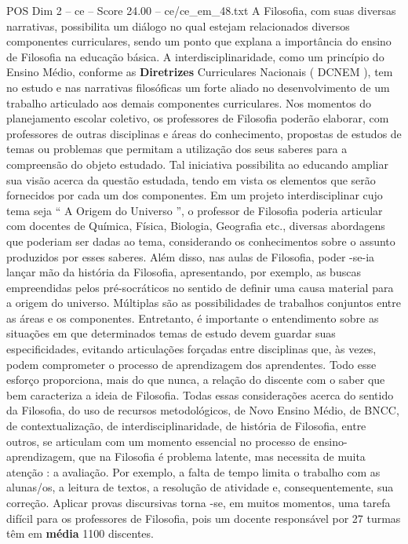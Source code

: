 \begin{textsample}{POS Dim 2 – ce – Score 24.00 – ce/ce\_em\_48.txt}
A Filosofia, com suas diversas narrativas, possibilita um diálogo no qual estejam relacionados diversos componentes curriculares, sendo um ponto que explana a importância do ensino de Filosofia na educação básica.
A interdisciplinaridade, como um princípio do Ensino Médio, conforme as \textbf{Diretrizes} Curriculares Nacionais ( DCNEM ), tem no estudo e nas narrativas filosóficas um forte aliado no desenvolvimento de um trabalho articulado aos demais componentes curriculares.
Nos momentos do planejamento escolar coletivo, os professores de Filosofia poderão elaborar, com professores de outras disciplinas e áreas do conhecimento, propostas de estudos de temas ou problemas que permitam a utilização dos seus saberes para a compreensão do objeto estudado.
Tal iniciativa possibilita ao educando ampliar sua visão acerca da questão estudada, tendo em vista os elementos que serão fornecidos por cada um dos componentes.
Em um projeto interdisciplinar cujo tema seja “ A Origem do Universo ”, o professor de Filosofia poderia articular com docentes de Química, Física, Biologia, Geografia etc., diversas abordagens que poderiam ser dadas ao tema, considerando os conhecimentos sobre o assunto produzidos por esses saberes.
Além disso, nas aulas de Filosofia, poder -se-ia lançar mão da história da Filosofia, apresentando, por exemplo, as buscas empreendidas pelos pré-socráticos no sentido de definir uma causa material para a origem do universo.
Múltiplas são as possibilidades de trabalhos conjuntos entre as áreas e os componentes.
Entretanto, é importante o entendimento sobre as situações em que determinados temas de estudo devem guardar suas especificidades, evitando articulações forçadas entre disciplinas que, às vezes, podem comprometer o processo de aprendizagem dos aprendentes.
Todo esse esforço proporciona, mais do que nunca, a relação do discente com o saber que bem caracteriza a ideia de Filosofia.
Todas essas considerações acerca do sentido da Filosofia, do uso de recursos metodológicos, de Novo Ensino Médio, de BNCC, de contextualização, de interdisciplinaridade, de história de Filosofia, entre outros, se articulam com um momento essencial no processo de ensino-aprendizagem, que na Filosofia é problema latente, mas necessita de muita atenção : a avaliação.
Por exemplo, a falta de tempo limita o trabalho com as alunas/os, a leitura de textos, a resolução de atividade e, consequentemente, sua correção.
Aplicar provas discursivas torna -se, em muitos momentos, uma tarefa difícil para os professores de Filosofia, pois um docente responsável por 27 turmas têm em \textbf{média} 1100 discentes.

\end{textsample}
